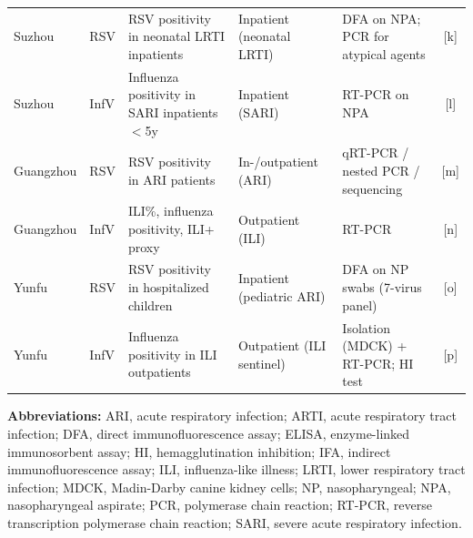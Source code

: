 \begin{landscape}
\begin{table}[htbp]
\begin{threeparttable}
\begin{tabularx}{\textwidth}{@{}l l X X X c@{}}
    Suzhou  & RSV  & RSV positivity in neonatal LRTI inpatients            & Inpatient (neonatal LRTI)        & DFA on NPA; PCR for atypical agents           & [k] \\
    Suzhou  & InfV & Influenza positivity in SARI inpatients $<$5y         & Inpatient (SARI)                 & RT-PCR on NPA                                  & [l] \\
    
    Guangzhou & RSV  & RSV positivity in ARI patients                     & In-/outpatient (ARI)             & qRT-PCR / nested PCR / sequencing             & [m] \\
    Guangzhou & InfV & ILI\%, influenza positivity, ILI+ proxy            & Outpatient (ILI)                 & RT-PCR                                        & [n] \\
    
    Yunfu  & RSV  & RSV positivity in hospitalized children                & Inpatient (pediatric ARI)        & DFA on NP swabs (7-virus panel)               & [o] \\
    Yunfu  & InfV & Influenza positivity in ILI outpatients                & Outpatient (ILI sentinel)        & Isolation (MDCK) + RT-PCR; HI test            & [p] \\
    
    \bottomrule
    \end{tabularx}

    \begin{tablenotes}[flushleft]
    \footnotesize
    \item \textbf{Abbreviations:} 
    ARI, acute respiratory infection; 
    ARTI, acute respiratory tract infection; 
    DFA, direct immunofluorescence assay; 
    ELISA, enzyme-linked immunosorbent assay; 
    HI, hemagglutination inhibition; 
    IFA, indirect immunofluorescence assay; 
    ILI, influenza-like illness; 
    LRTI, lower respiratory tract infection; 
    MDCK, Madin-Darby canine kidney cells; 
    NP, nasopharyngeal; 
    NPA, nasopharyngeal aspirate; 
    PCR, polymerase chain reaction; 
    RT-PCR, reverse transcription polymerase chain reaction; 
    SARI, severe acute respiratory infection.
    

\end{tablenotes}
\end{threeparttable}
\end{table}
\end{landscape}
